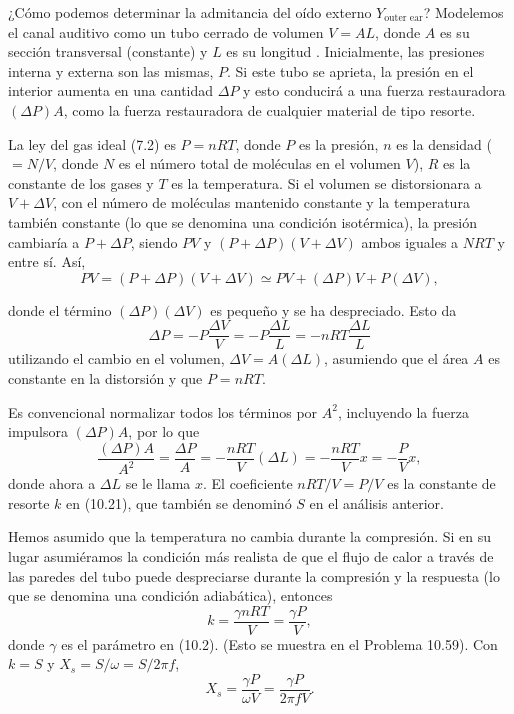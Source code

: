 \documentclass[12pt]{book}
\begin{document}
¿Cómo podemos determinar la admitancia del oído externo $Y_{\text{outer ear}}$? Modelemos el canal auditivo como un tubo cerrado de volumen $V = AL$, donde $A$ es su sección transversal (constante) y $L$ es su longitud \cite{32, 53, 54}. Inicialmente, las presiones interna y externa son las mismas, $P$. Si este tubo se aprieta, la presión en el interior aumenta en una cantidad $\Delta P$ y esto conducirá a una fuerza restauradora $(\Delta P)A$, como la fuerza restauradora de cualquier material de tipo resorte.

La ley del gas ideal (7.2) es $P = nRT$, donde $P$ es la presión, $n$ es la densidad ($= N/V$, donde $N$ es el número total de moléculas en el volumen $V$), $R$ es la constante de los gases y $T$ es la temperatura. Si el volumen se distorsionara a $V + \Delta V$, con el número de moléculas mantenido constante y la temperatura también constante (lo que se denomina una condición isotérmica), la presión cambiaría a $P + \Delta P$, siendo $PV$ y $(P + \Delta P)(V + \Delta V)$ ambos iguales a $NRT$ y entre sí. Así,
\begin{equation}
PV = (P + \Delta P)(V + \Delta V) \simeq PV + (\Delta P)V + P(\Delta V),
\label{eq:10.58}
\end{equation}

donde el término $(\Delta P)(\Delta V)$ es pequeño y se ha despreciado. Esto da
\begin{equation}
\Delta P = -P \frac{\Delta V}{V} = -P \frac{\Delta L}{L} = -nRT \frac{\Delta L}{L}
\label{eq:10.59}
\end{equation}
utilizando el cambio en el volumen, $\Delta V = A(\Delta L)$, asumiendo que el área $A$ es constante en la distorsión y que $P = nRT$.

Es convencional normalizar todos los términos por $A^2$, incluyendo la fuerza impulsora $(\Delta P)A$, por lo que
\begin{equation}
\frac{(\Delta P)A}{A^2} = \frac{\Delta P}{A} = -\frac{nRT}{V} (\Delta L) = -\frac{nRT}{V} x = -\frac{P}{V} x,
\label{eq:10.60}
\end{equation}
donde ahora a $\Delta L$ se le llama $x$. El coeficiente $nRT/V = P/V$ es la constante de resorte $k$ en (10.21), que también se denominó $S$ en el análisis anterior.

Hemos asumido que la temperatura no cambia durante la compresión. Si en su lugar asumiéramos la condición más realista de que el flujo de calor a través de las paredes del tubo puede despreciarse durante la compresión y la respuesta (lo que se denomina una condición adiabática), entonces
\begin{equation}
k = \frac{\gamma nRT}{V} = \frac{\gamma P}{V},
\label{eq:10.61}
\end{equation}
donde $\gamma$ es el parámetro en (10.2). (Esto se muestra en el Problema 10.59). Con $k = S$ y $X_s = S/\omega = S/2\pi f$,
\begin{equation}
X_s = \frac{\gamma P}{\omega V} = \frac{\gamma P}{2\pi f V}.
\label{eq:10.62}
\end{equation}
\end{document}

